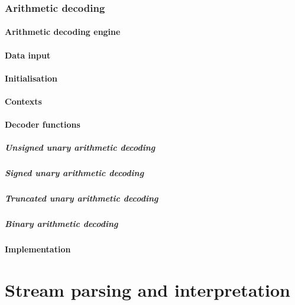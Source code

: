 \clearpage
\section{Arithmetic decoding}
\subsection{Arithmetic decoding engine}
\subsection{Data input}
\subsection{Initialisation}
\subsection{Contexts}
\subsection{Decoder functions}
\subsubsection{Unsigned unary arithmetic decoding}
\subsubsection{Signed unary arithmetic decoding}
\subsubsection{Truncated unary arithmetic decoding}
\subsubsection{Binary arithmetic decoding}
\subsection{Implementation}

\part{Stream parsing and interpretation}

